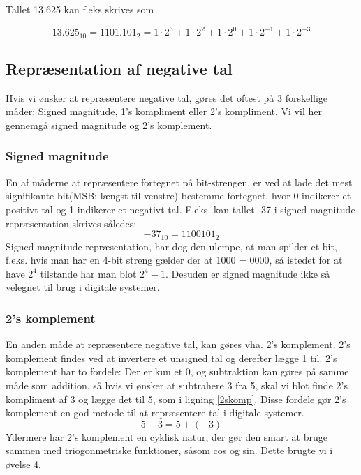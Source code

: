 Tallet 13.625 kan f.eks skrives som

\begin{equation}
13.625_{10} = 1101.101_2 = 1 \cdot 2^3+1 \cdot 2^2+1 \cdot 2^0+1 \cdot 2^{-1}+1 \cdot 2^{-3}
\end{equation}

\subsection{Repræsentation af negative tal}
Hvis vi ønsker at repræsentere negative tal, gøres det oftest på 3 forskellige måder: 
Signed magnitude, 1's kompliment eller 2's kompliment. Vi vil her gennemgå signed magnitude og 2's komplement.
\subsubsection{Signed magnitude}
En af måderne at repræsentere fortegnet på bit-strengen, er ved at lade det mest signifikante bit(MSB: længst til venstre) bestemme fortegnet, hvor 0 indikerer et positivt tal og 1 indikerer et negativt tal.  F.eks. kan tallet -37 i signed magnitude repræsentation skrives således:
\begin{equation}
-37_{10} = 1100101_2 
\end{equation}
Signed magnitude repræsentation, har dog den ulempe, at man spilder et bit, f.eks. hvis man har en 4-bit streng gælder der at 1000 =  0000, så istedet for at have $2^4$ tilstande har man blot $2^4-1$. Desuden er signed magnitude ikke så velegnet til brug i digitale systemer.\cite[s.~260]{Dlogic}
\subsubsection{2's komplement}
En anden måde at repræsentere negative tal, kan gøres vha. 2's komplement. 2's komplement findes ved at invertere et unsigned tal og derefter lægge 1 til. 2's komplement har to fordele: Der er kun et 0, og subtraktion kan gøres på samme måde som addition, så hvis vi ønsker at subtrahere 3 fra 5, skal vi blot finde 2's kompliment af 3 og lægge det til 5, som i ligning \ref{2skomp}.  Disse fordele gør 2's komplement en god metode til at repræsentere tal i digitale systemer.
\begin{equation}
\label{2skomp}
 5-3 = 5+(-3)
\end{equation}
Ydermere har 2's komplement en cyklisk natur, der gør den smart at bruge sammen med triogonmetriske funktioner, såsom cos og sin. Dette brugte vi i øvelse 4.

